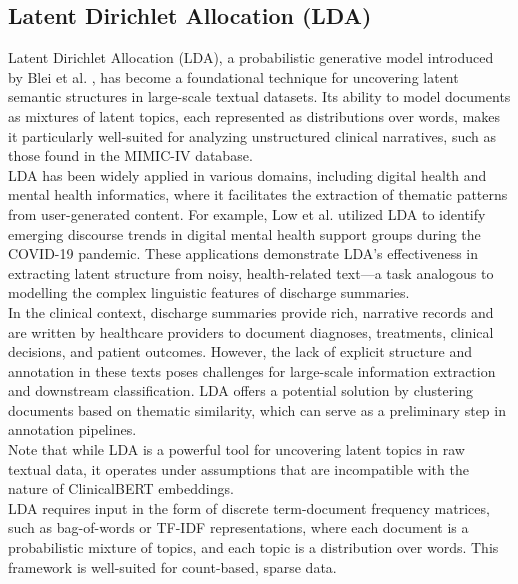 \subsection{Latent Dirichlet Allocation (LDA)}

Latent Dirichlet Allocation (LDA), a probabilistic generative model introduced by Blei et al. \cite{blei2003}, has become a foundational technique for uncovering latent semantic structures in large-scale textual datasets. Its ability to model documents as mixtures of latent topics, each represented as distributions over words, makes it particularly well-suited for analyzing unstructured clinical narratives, such as those found in the MIMIC-IV database. \\

LDA has been widely applied in various domains, including digital health and mental health informatics, where it facilitates the extraction of thematic patterns from user-generated content. For example, Low et al. \cite{low2020} utilized LDA to identify emerging discourse trends in digital mental health support groups during the COVID-19 pandemic. These applications demonstrate LDA’s effectiveness in extracting latent structure from noisy, health-related text—a task analogous to modelling the complex linguistic features of discharge summaries. \\

In the clinical context, discharge summaries provide rich, narrative records and are written by healthcare providers to document diagnoses, treatments, clinical decisions, and patient outcomes. However, the lack of explicit structure and annotation in these texts poses challenges for large-scale information extraction and downstream classification. LDA offers a potential solution by clustering documents based on thematic similarity, which can serve as a preliminary step in annotation pipelines. \\

Note that while LDA is a powerful tool for uncovering latent topics in raw textual data, it operates under assumptions that are incompatible with the nature of ClinicalBERT embeddings. \\

LDA requires input in the form of discrete term-document frequency matrices, such as bag-of-words or TF-IDF representations, where each document is a probabilistic mixture of topics, and each topic is a distribution over words. This framework is well-suited for count-based, sparse data.


